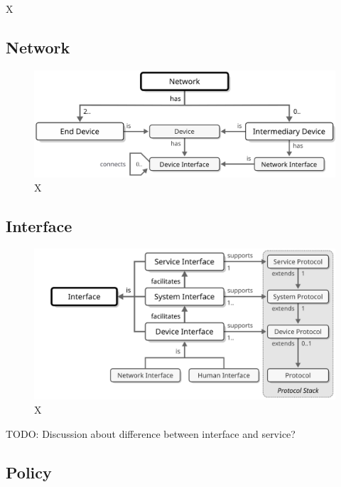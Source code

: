 X

\subsection{Network}
\label{sec:reference-model:network}

\begin{figure}[ht!]
  \centering
  \includegraphics[scale=0.9]{figures/network}
  \caption{
    X
  }
  \label{fig:network}
\end{figure}

\subsection{Interface}
\label{sec:reference-model:interface}

\begin{figure}[ht!]
  \centering
  \includegraphics[scale=0.9]{figures/interface}
  \caption{
    X
  }
  \label{fig:interface}
\end{figure}

TODO: Discussion about difference between interface and service?

\subsection{Policy}
\label{sec:reference-model:policy}

